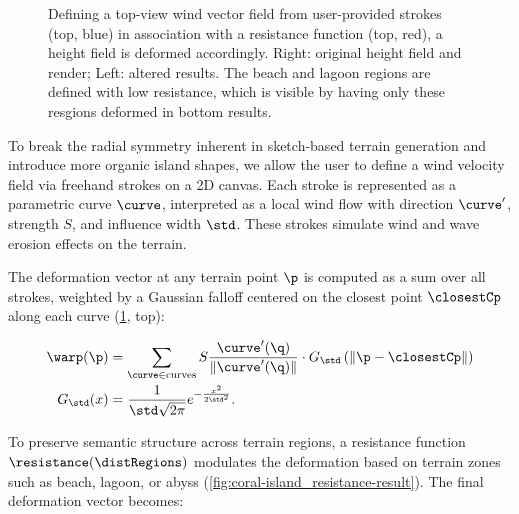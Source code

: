 
\begin{figure}
    \caption{Defining a top-view wind vector field from user-provided strokes (top, blue) in association with a resistance function (top, red), a height field is deformed accordingly. Right: original height field and render; Left: altered results. The beach and lagoon regions are defined with low resistance, which is visible by having only these resgions deformed in bottom results. }
    \label{fig:coral-island_wind-effect-result}
\end{figure}

To break the radial symmetry inherent in sketch-based terrain generation and introduce more organic island shapes, we allow the user to define a wind velocity field via freehand strokes on a 2D canvas. Each stroke is represented as a parametric curve $\curve$, interpreted as a local wind flow with direction $\curve'$, strength $S$, and influence width $\std$. These strokes simulate wind and wave erosion effects on the terrain.

The deformation vector at any terrain point $\p$ is computed as a sum over all strokes, weighted by a Gaussian falloff centered on the closest point $\closestCp$ along each curve (\cref{fig:coral-island_wind-effect-result}, top):

\begin{align}
    \warp(\p) &= \sum_{\curve \in \text{curves}} S \frac{\curve'(\q)}{\| \curve'(\q) \| } \cdot G_\std\left(\| \p - \closestCp \| \right) \\
    G_\std(x) &= \frac{1}{\std \sqrt{2\pi}} e^{-\frac{x^2}{2 \std^2}}.
\end{align}

To preserve semantic structure across terrain regions, a resistance function $\resistance(\distRegions)$ modulates the deformation based on terrain zones such as beach, lagoon, or abyss (\cref{fig:coral-island_resistance-result}). The final deformation vector becomes:

